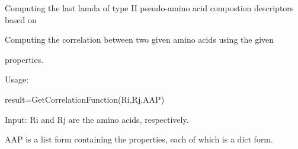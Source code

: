 \documentclass[letterpaper,10pt,english]{sphinxmanual}
\begin{document}

\begin{fulllineitems}
\label{reference/PseudoAAC:PseudoAAC.GetAPseudoAAC2}
Computing the last lamda of type II pseudo-amino acid compostion descriptors based on

\end{fulllineitems}


\begin{fulllineitems}
\label{reference/PseudoAAC:PseudoAAC.GetCorrelationFunction}
Computing the correlation between two given amino acids using the given

properties.

Usage:

result=GetCorrelationFunction(Ri,Rj,AAP)

Input: Ri and Rj are the amino acids, respectively.

AAP is a list form containing the properties, each of which is a dict form.

\end{fulllineitems}

\end{document}
